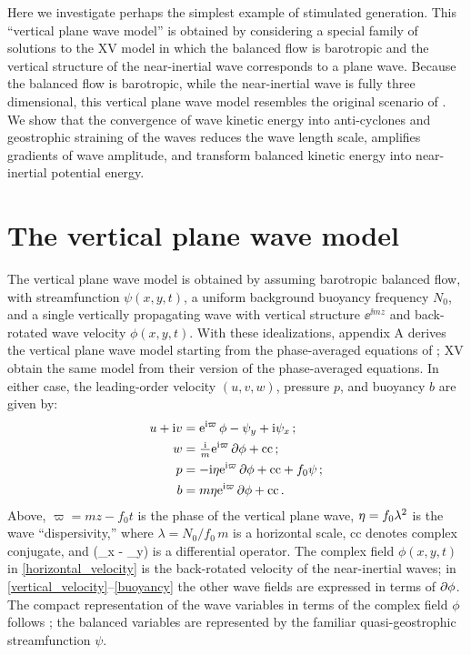 \documentclass{jfm}
\newcommand{\NIW}{near-inertial wave}
\begin{document}
\nocite{gertz_straub2009, whitt_thomas2015, barkan_etal2016, jing_etal2017}

Here  we investigate perhaps the simplest example  of stimulated generation.
This ``vertical plane wave model'' is   obtained by considering a special family
of solutions to the XV model in which the balanced flow is barotropic and the
vertical structure of the near-inertial wave corresponds to a plane wave. Because
the balanced flow is barotropic, while the \NIW{} is fully three dimensional,
this vertical plane wave model resembles the original scenario of
\cite{gertz_straub2009}. We show that the convergence of wave kinetic energy
into anti-cyclones and  geostrophic straining of the  waves reduces the wave length
scale, amplifies  gradients of wave amplitude, and transform balanced kinetic
energy into near-inertial potential energy.

\section{The vertical plane wave model}\label{TheModel}

The vertical plane wave model  is obtained by  assuming barotropic balanced flow, with streamfunction $\psi(x,y,t)$, a uniform background buoyancy frequency $N_0$,  and a single vertically propagating wave  with vertical structure $\ee^{\ii m z}$ and back-rotated wave velocity $\phi(x,y,t)$. With these idealizations,  appendix A derives the vertical plane wave model  starting from the phase-averaged equations of  \cite{wagner_young2016};   XV obtain the same model from their version of the  phase-averaged equations. In either case, the leading-order  velocity $(u,v,w)$, pressure $p$, and buoyancy $b$ are given by:
\begin{align}
\label{horizontal_velocity}
u + {\rm i} v  &= {\rm e}^{{\rm i} \varpi}\,\phi -\psi_y + {\rm i}\psi_x\,;\\
  \label{vertical_velocity}
  w &= \tfrac{{\rm i}}{ m}{\rm e}^{{\rm i} \varpi} \, \partial  \phi  + \text{cc}  \,;\\
\label{pressure}
\qquad p &= - {\rm i} \eta{\rm e}^{{\rm i} \varpi} \, \partial \phi
+\text{cc} + f_0 \psi \,;\\
\label{buoyancy}
b &=  m \eta{\rm e}^{{\rm i} \varpi} \, \partial \phi + \text{cc}
  \, .
\end{align}
Above, $\varpi = m z - f_0 t $ is the  phase of the vertical plane wave,
$\eta = f_0\lambda^2$ is the wave ``dispersivity,'' where
$\lambda = {N_0}/{f_0\, m}$ is a  horizontal scale, cc denotes
complex conjugate, and
\beq
\p {} \half (\p_x - \ii \p_y)
\eeq
is a differential operator. The complex field  $ \phi(x,y,t)$ in \eqref{horizontal_velocity}  is the  back-rotated velocity of the \NIW s;  in  \eqref{vertical_velocity}--\eqref{buoyancy} the  other wave fields   are  expressed in terms of  $\partial \phi$. The compact representation of the wave variables in terms of the complex field $\phi$ follows \cite{young_benjelloul1997}; the balanced variables are represented by the familiar quasi-geostrophic streamfunction $\psi$.
\end{document}
